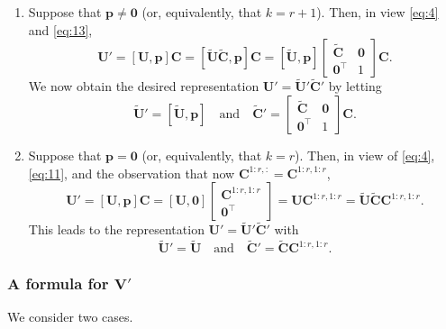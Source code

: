 \documentclass[11pt,a4paper]{article}
\theoremstyle{break}
\numberwithin{dummy}{section}
\theoremstyle{plain}
\theoremstyle{plain}
\theoremstyle{plain}
\theoremstyle{plain}
\theoremstyle{plain}
\theoremstyle{MyNonumberplain}
\newcommand{\0}{\M{0}}
\newcommand{\M}[1]{\mathbf{#1}}
\newcommand{\Mt}[1]{\tilde{\M{#1}}}
\newcommand{\T}{\top}
\newcommand{\ve}[1]{\mathbf{#1}}
\begin{document}
\begin{enumerate}[font=\upshape,label=(\roman*),wide,align=right]
\item Suppose that $\ve{p} \neq \0$ (or, equivalently, that $k= r + 1$). Then, in view \eqref{eq:4} and \eqref{eq:13},
\begin{displaymath}
  \M{U}' = [\M{U}, \ve{p}] \M{C} = [\Mt{U} \Mt{C}, \ve{p}] \M{C}
  =
  [\Mt{U}, \ve{p}]
  \begin{bmatrix}
    \Mt{C} & \0
    \\
    \0^\T & 1
  \end{bmatrix}
  \M{C}.
\end{displaymath}
We now obtain the desired representation 
\begin{math}
  \M{U}' = \Mt{U}' \Mt{C}'
\end{math}
by letting
\begin{displaymath}
  \Mt{U}' = [\Mt{U}, \ve{p}]
  \quad
  \text{and}
  \quad
  \Mt{C}' =
  \begin{bmatrix}
    \Mt{C} & \0
    \\
    \0^\T & 1
  \end{bmatrix}
  \M{C}.
\end{displaymath}
\item Suppose that $\ve{p} = \0$ (or, equivalently, that $k = r$). Then, in view of \eqref{eq:4}, \eqref{eq:11}, and the observation that now $\M{C}^{1:r,:} = \M{C}^{1:r, 1:r}$,
\begin{displaymath}
  \M{U}' = [\M{U}, \ve{p}] \M{C}
  = [\M{U}, \0]
  \begin{bmatrix}
    \M{C}^{1:r, 1:r}
    \\
    \0^\T
  \end{bmatrix}
  = \M{U} \M{C}^{1:r, 1:r}
  = \Mt{U} \Mt{C}  \M{C}^{1:r, 1:r}.
\end{displaymath}
This leads to the representation
\begin{math}
  \M{U}' = \Mt{U}' \Mt{C}'
\end{math}
with
\begin{displaymath}
  \Mt{U}' =  \Mt{U}
  \quad
  \text{and}
  \quad
  \Mt{C}' = \Mt{C}  \M{C}^{1:r, 1:r}.
\end{displaymath}
\end{enumerate}

\subsubsection{A formula for $\M{V}'$}

We consider two cases.
\end{document}
